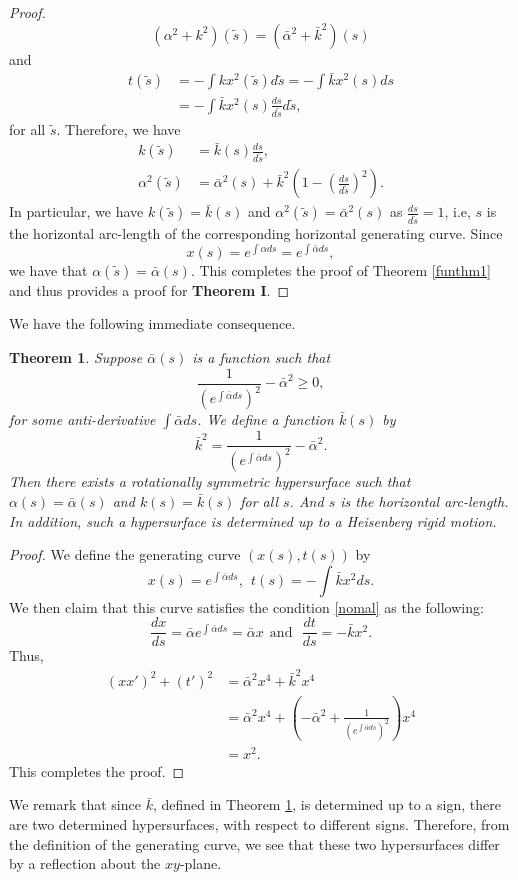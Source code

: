 \documentclass[12pt]{amsart}
\newtheorem{thm}{\bf Theorem}[section]
\theoremstyle{definition}\newtheorem{exa}[thm]{\sc Example}
\theoremstyle{definition}\newtheorem{de}[thm]{\sc Definition}
\theoremstyle{definition}\newtheorem{rem}[thm]{\sc Remark}
\theoremstyle{definition}\newtheorem{prob}[thm]{\it Problem}
\theoremstyle{definition}\newtheorem{fact}[thm]{\sc Fact}
\theoremstyle{definition}\newtheorem{claim}[thm]{\sc Claim}
\numberwithin{equation}{section}
\begin{document}
\begin{proof}
\[(\alpha^2+k^{2})(\tilde{s})=(\bar\alpha^2+\bar k^{2})(s)\] and
\begin{equation}\label{regecu2}
\begin{split}
t(\tilde{s})&=-\int kx^2(\tilde{s})d\tilde{s}=-\int \bar kx^2(s)ds\\
&=-\int \bar kx^2(s)\frac{ds}{d\tilde{s}}d\tilde{s},
\end{split}
\end{equation}
for all $\tilde{s}$.
Therefore, we have
\begin{equation}
\begin{split}
k(\tilde{s})&=\bar k(s)\frac{ds}{d\tilde{s}},\\
\alpha^2(\tilde{s})&=\bar\alpha^2(s)+\bar k^{2}\left(1-(\frac{ds}{d\tilde{s}})^2\right).
\end{split}
\end{equation}
In particular, we have $k(\tilde{s})=\bar k(s)$ and $\alpha^2(\tilde{s})=\bar\alpha^2(s)$ as $\frac{ds}{d\tilde{s}}=1$, i.e, $s$ is the horizontal arc-length of the corresponding horizontal generating curve. Since \[x(s)=e^{\int \alpha ds}=e^{\int\bar\alpha ds},\] we have that $\alpha(\tilde{s})=\bar\alpha(s)$. This completes the proof of Theorem \ref{funthm1} and thus provides a proof for {\bf Theorem I}.
\end{proof}

We have the following immediate consequence.
\begin{thm}\label{funthm2}
Suppose $\bar\alpha(s)$ is a function such that
\begin{equation}\label{nomal1}
\frac{1}{(e^{\int\bar\alpha ds})^2}-\bar\alpha^{2}\geq 0,
\end{equation} 
for some anti-derivative $\int\bar\alpha ds$. We define a function $\bar{k}(s)$ by
\[\bar{k}^2=\frac{1}{(e^{\int\bar\alpha ds})^2}-\bar\alpha^{2}.\]
Then there exists a rotationally symmetric hypersurface such that $\alpha(s)=\bar\alpha(s)$ and $k(s)=\bar k(s)$ for all $s$. And $s$ is the horizontal arc-length. In addition, such a hypersurface is determined up to a Heisenberg rigid motion.
\end{thm}
\begin{proof}
We define the generating curve $(x(s),t(s))$ by
\[x(s)=e^{\int\bar\alpha ds},\ \ t(s)=-\int\bar{k}x^{2}ds.\]
We then claim that this curve satisfies the condition \eqref{nomal} as the following:
\[\frac{dx}{ds}=\bar{\alpha}e^{\int\bar\alpha ds}=\bar{\alpha}x\ \ \textrm{and}\ \ \ \frac{dt}{ds}=-\bar{k}x^{2}.\]
Thus,
\[\begin{split}
(xx')^{2}+(t')^{2}&=\bar\alpha^{2}x^{4}+\bar{k}^{2}x^{4}\\
&=\bar\alpha^{2}x^{4}+\left(-\bar\alpha^{2}+\frac{1}{(e^{\int\bar\alpha ds})^2}\right)x^4\\
&=x^{2}.
\end{split}
\] This completes the proof. 
\end{proof}
We remark that since $\bar{k}$, defined in Theorem \ref{funthm2}, is determined up to a sign, there are two determined hypersurfaces, with respect to different signs. Therefore, from the definition of the generating curve, we see that these two hypersurfaces differ by a reflection about the $xy$-plane.
\end{document}
